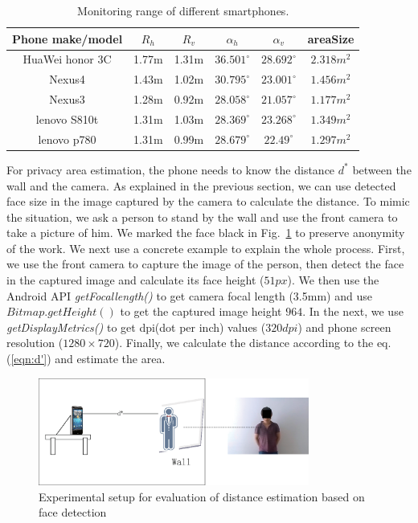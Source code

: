 \setlength{\tabcolsep}{4pt}
\begin{table}[!t]
\begin{center}
\caption{Monitoring range of different smartphones.}
\label{tab:area-results}
\begin{tabular}{|c|c|c|c|c|c|}
\hline

 Phone make/model & $R_h$ & $R_v$ & $\alpha_h$ & $\alpha_v$ & areaSize \\
\hline
\hline
 HuaWei honor 3C & 1.77m & 1.31m &  $36.501^\circ$  & $28.692^\circ$ & $2.318m^2$\\
\hline
 Nexus4 & 1.43m & 1.02m &  $ 30.795^\circ $  & $23.001^\circ$ & $1.456m^2$\\
 \hline
 Nexus3 & 1.28m & 0.92m &  $ 28.058^\circ $  & $ 21.057^\circ$ & $1.177m^2$\\
 \hline
 lenovo S810t & 1.31m & 1.03m &  $ 28.369^\circ $  & $ 23.268 ^\circ$ & $1.349m^2$\\
 \hline
 lenovo p780 & 1.31m & 0.99m &  $ 28.679^\circ $  & $  22.49^\circ$ & $1.297m^2$\\
  \hline
\end{tabular}
\end{center}
\end{table}

For privacy area estimation, the phone needs to know the distance $d^*$ between the wall and the camera.  As explained in the previous section, we can use detected face size in the image captured by the camera to calculate the distance.
To mimic the situation, we ask a person  to stand by the wall and use the front camera to take a picture of him. We marked the face black  in Fig.~\ref{fig:distance-exp} to preserve anonymity of the work.
We next use a concrete example to explain the whole process.  First, we use the front camera to capture the image of the person, then detect the face in the captured image and calculate its face height ($51px$). We then use the Android API \textit{getFocallength()} to get camera focal length (3.5mm) and use $Bitmap.getHeight()$ to get the captured image height $964$. In the next, we use \textit{getDisplayMetrics()} to get dpi(dot per inch) values ($320 dpi$) and phone screen resolution ($1280\times720$). Finally, we calculate the distance according to the eq.(\ref{eqn:d'}) and estimate the area.
\begin{figure}[H]\label{fig:expfacedistance}
\centering
\includegraphics[width=3.5in]{epsfacedistance.eps}
\caption{Experimental setup for evaluation of distance estimation based on face detection}
\label{fig:distance-exp}
\end{figure}


